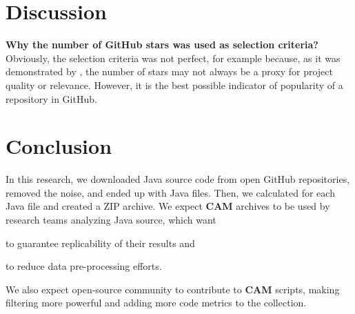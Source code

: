 \documentclass[sigplan,nonacm,review,anonymous]{acmart}
\newcommand\cam{{\sffamily\bfseries CAM}}
\begin{document}
\section{Discussion}\label{sec:discussion}

\textbf{Why the number of GitHub stars was used as selection criteria?}
Obviously, the selection criteria was not perfect, for example because,
as it was demonstrated by \citet{munaiah2017curating}, the number of stars
may not always be a proxy for project quality or relevance. However,
it is the best possible indicator of popularity of a repository in GitHub.

\section{Conclusion}\label{sec:conclusion}

In this research, we downloaded Java source code from
\unskip{}
open GitHub repositories, removed the noise, and ended up with
\unskip{} Java files.
Then, we calculated
\unskip{}
for each Java file and created a ZIP archive.
We expect \cam{} archives to be used by research teams analyzing Java source, which want
\begin{inparaenum}[(a)]
\item to guarantee replicability of their results
and
\item to reduce data pre-processing efforts.
\end{inparaenum}
We also expect open-source community to contribute to \cam{} scripts,
making filtering more powerful and adding more code metrics to the collection.



\end{document}
